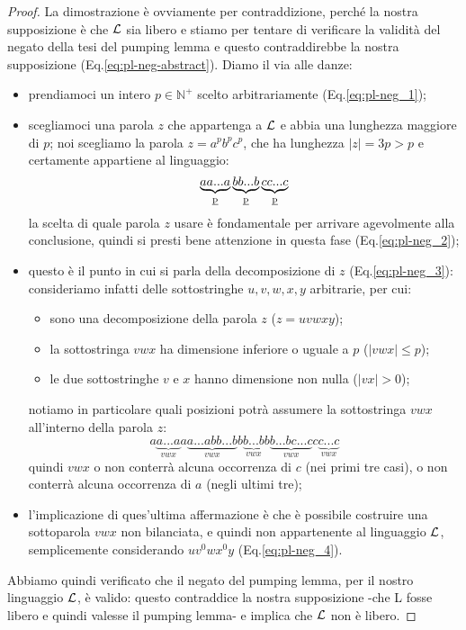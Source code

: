 \documentclass[class=book, crop=false, oneside, 12pt]{standalone}
\begin{document}
  \begin{proof}
    La dimostrazione è ovviamente per contraddizione, perché la nostra supposizione è che \(\mathcal{L}\) sia libero e stiamo per tentare di verificare la validità del negato della tesi del pumping lemma e questo contraddirebbe la nostra supposizione (Eq.\ref{eq:pl-neg-abstract}). Diamo il via alle danze:
    \begin{itemize}
      \item prendiamoci un intero \(p \in \mathbb{N}^+\) scelto arbitrariamente (Eq.\ref{eq:pl-neg_1});
      \item scegliamoci una parola \(z\) che appartenga a \(\mathcal{L}\) e abbia una lunghezza maggiore di \(p\); noi scegliamo la parola \(z = a^pb^pc^p\), che ha lunghezza \(|z| = 3p > p\) e certamente appartiene al linguaggio:
      \begin{equation*}
        \underbrace{aa...a}_\text{\emph{p}}\underbrace{bb...b}_\text{\emph{p}}\underbrace{cc...c}_\text{\emph{p}}
      \end{equation*}
      la scelta di quale parola \(z\) usare è fondamentale per arrivare agevolmente alla conclusione, quindi si presti bene attenzione in questa fase (Eq.\ref{eq:pl-neg_2});
      \item questo è il punto in cui si parla della decomposizione di \(z\) (Eq.\ref{eq:pl-neg_3}): consideriamo infatti delle sottostringhe \(u, v, w, x, y\) arbitrarie, per cui:
      \begin{itemize}
        \item sono una decomposizione della parola \(z\) (\(z = uvwxy\));
        \item la sottostringa \(vwx\) ha dimensione inferiore o uguale a \(p\) (\(|vwx| \le p\));
        \item le due sottostringhe \(v\) e \(x\) hanno dimensione non nulla (\(|vx| > 0\));
      \end{itemize}
      notiamo in particolare quali posizioni potrà assumere la sottostringa \(vwx\) all'interno della parola \(z\):
      \begin{equation*}
        a\underbrace{a...a}_{vwx}
        a\underbrace{a...abb...b}_{vwx}
        b\underbrace{b...b}_{vwx}
        b\underbrace{b...bc...c}_{vwx}
        c\underbrace{c...c}_{vwx}
      \end{equation*}
      quindi \(vwx\) o non conterrà alcuna occorrenza di \(c\) (nei primi tre casi), o non conterrà alcuna occorrenza di \(a\) (negli ultimi tre);
      \item l'implicazione di ques'ultima affermazione è che è possibile costruire una sottoparola \(vwx\) non bilanciata, e quindi non appartenente al linguaggio \(\mathcal{L}\), semplicemente considerando \(uv^0wx^0y\) (Eq.\ref{eq:pl-neg_4}).
    \end{itemize}
    Abbiamo quindi verificato che il negato del pumping lemma, per il nostro linguaggio \(\mathcal{L}\), è valido: questo contraddice la nostra supposizione -che L fosse libero e quindi valesse il pumping lemma- e implica che \(\mathcal{L}\) non è libero.
  \end{proof}
\end{document}
